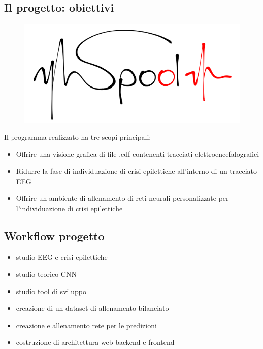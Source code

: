 \documentclass[xcolor=x11names,compress, 
					handout %
]{beamer}
\theoremstyle{definition} \newtheorem{esempio}{Esempio}
\theoremstyle{definition}
\begin{document}
	\subsection{Il progetto: obiettivi}
		\begin{frame}{\subsecname}
			\begin{figure}
				\includegraphics[scale=0.3]{immagini/prova3-piccolo}
			\end{figure}
			
			Il programma realizzato ha tre scopi principali:\pause
			\begin{itemize}
				\item Offrire una visione grafica di file .edf contenenti tracciati elettroencefalografici \pause
				\item Ridurre la fase di individuazione di crisi epilettiche all'interno di un tracciato EEG \pause
				\item Offrire un ambiente di allenamento di reti neurali personalizzate per l'individuazione di crisi epilettiche
			\end{itemize}
		\end{frame}
		
	\subsection{Workflow progetto}
		\begin{frame}{\subsecname}
			\begin{itemize}
				\item studio EEG e crisi epilettiche\pause
				\item studio teorico CNN\pause
				\item studio tool di sviluppo\pause
				\item creazione di un dataset di allenamento bilanciato\pause
				\item creazione e allenamento rete per le predizioni\pause
				\item costruzione di architettura web backend e frontend
			\end{itemize}
		\end{frame}
	
\end{document}
